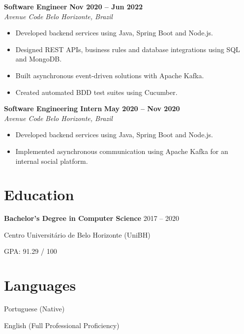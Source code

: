 \documentclass[10pt,a4paper]{article}
\newcommand{\job}[4]{%
\textbf{#1} \hfill \textbf{#2}\\
\textit{#3} \hfill \textit{#4}\\[-2pt]
}
\begin{document}

\job{Software Engineer}{Nov 2020 -- Jun 2022}{Avenue Code}{Belo Horizonte, Brazil}

\begin{itemize}

\item Developed backend services using Java, Spring Boot and Node.js.

\item Designed REST APIs, business rules and database integrations using SQL and MongoDB.

\item Built asynchronous event-driven solutions with Apache Kafka.

\item Created automated BDD test suites using Cucumber.

\end{itemize}


\job{Software Engineering Intern}{May 2020 -- Nov 2020}{Avenue Code}{Belo Horizonte, Brazil}

\begin{itemize}

\item Developed backend services using Java, Spring Boot and Node.js.

\item Implemented asynchronous communication using Apache Kafka for an internal social platform.

\end{itemize}


\section{Education}

\textbf{Bachelor's Degree in Computer Science}
\hfill
2017 -- 2020

Centro Universitário de Belo Horizonte (UniBH)

GPA: 91.29 / 100


\section{Languages}

Portuguese (Native)

English (Full Professional Proficiency)
\end{document}
